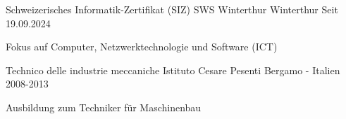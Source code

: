 

\begin{cventries}


   \cventry
    {Schweizerisches Informatik-Zertifikat (SIZ)}
    {SWS Winterthur}
    {Winterthur}
    {Seit 19.09.2024}
    {
      \begin{cvitems} %
	\item{Fokus auf Computer, Netzwerktechnologie und Software (ICT)}
      \end{cvitems}
    }

	   \cventry
	{Technico delle industrie meccaniche}
	{Istituto Cesare Pesenti}
	{Bergamo - Italien}
	{2008-2013}
	{
		\begin{cvitems} %
			\item {Ausbildung zum Techniker für Maschinenbau}
		\end{cvitems}
	}
	

\end{cventries}
